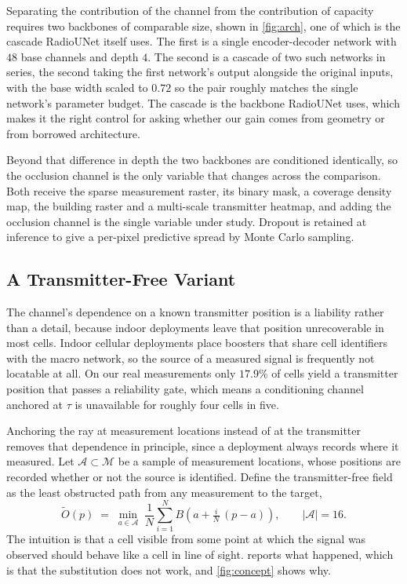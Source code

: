 Separating the contribution of the channel from the contribution of capacity requires
two backbones of comparable size, shown in \cref{fig:arch}, one of which is the
cascade RadioUNet itself uses. The first is a single encoder-decoder network with $48$ base
channels and depth $4$. The second is a cascade of two such networks in series, the
second taking the first network's output alongside the original inputs, with the
base width scaled to $0.72$ so the pair roughly matches the single network's
parameter budget. The cascade is the backbone RadioUNet uses, which makes it the
right control for asking whether our gain comes from geometry or from borrowed
architecture.

Beyond that difference in depth the two backbones are conditioned identically, so the
occlusion channel is the only variable that changes across the comparison. Both receive the sparse measurement raster, its binary mask, a coverage
density map, the building raster and a multi-scale transmitter heatmap, and adding
the occlusion channel is the single variable under study. Dropout is retained at
inference to give a per-pixel predictive spread by Monte Carlo sampling.

\subsection{A Transmitter-Free Variant}
\label{sec:txfree}

The channel's dependence on a known transmitter position is a liability rather than a
detail, because indoor deployments leave that position unrecoverable in most cells.
Indoor cellular deployments place boosters that share cell identifiers with the macro network, so
the source of a measured signal is frequently not locatable at all. On our real
measurements only $17.9\%$ of cells yield a transmitter position that passes a
reliability gate, which means a conditioning channel anchored at $\tau$ is
unavailable for roughly four cells in five.

Anchoring the ray at measurement locations instead of at the transmitter removes that
dependence in principle, since a deployment always records where it measured. Let
$\mathcal{A} \subset \mathcal{M}$ be a sample of measurement locations, whose positions
are recorded whether or not the source is identified.
Define the transmitter-free field as the least obstructed path from any measurement
to the target,
%
\begin{equation}
\tilde{O}(p) \;=\; \min_{a \in \mathcal{A}} \; \frac{1}{N}\sum_{i=1}^{N}
 B\!\left(a + \tfrac{i}{N}\,(p - a)\right),
\qquad |\mathcal{A}| = 16 .
\label{eq:occmeas}
\end{equation}
%
The intuition is that a cell visible from some point at which the signal was
observed should behave like a cell in line of sight. 
reports what happened, which is that the substitution does not work, and
\cref{fig:concept} shows why.
